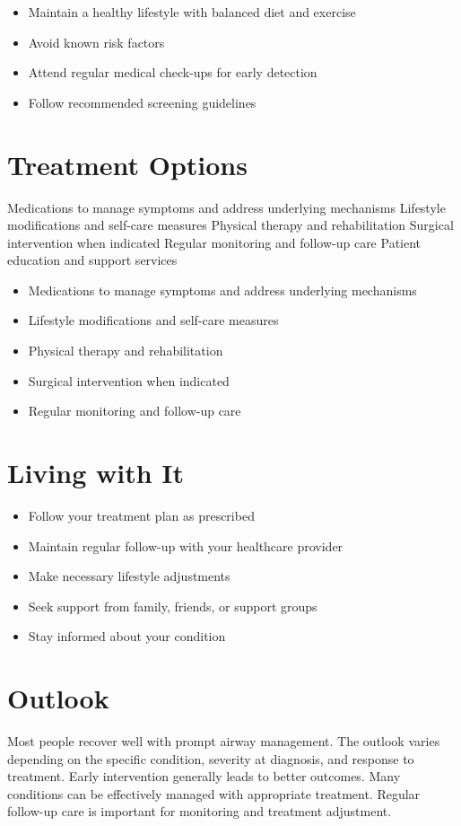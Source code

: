 \begin{itemize}[noitemsep]
  \item Maintain a healthy lifestyle with balanced diet and exercise
  \item Avoid known risk factors
  \item Attend regular medical check-ups for early detection
  \item Follow recommended screening guidelines
\end{itemize}
\section{Treatment Options}
Medications to manage symptoms and address underlying mechanisms Lifestyle modifications and self-care measures Physical therapy and rehabilitation Surgical intervention when indicated Regular monitoring and follow-up care Patient education and support services

\begin{itemize}[noitemsep]
  \item Medications to manage symptoms and address underlying mechanisms
  \item Lifestyle modifications and self-care measures
  \item Physical therapy and rehabilitation
  \item Surgical intervention when indicated
  \item Regular monitoring and follow-up care
\end{itemize}
\section{Living with It}
\begin{itemize}[noitemsep]
  \item Follow your treatment plan as prescribed
  \item Maintain regular follow-up with your healthcare provider
  \item Make necessary lifestyle adjustments
  \item Seek support from family, friends, or support groups
  \item Stay informed about your condition
\end{itemize}
\section{Outlook}
Most people recover well with prompt airway management. The outlook varies depending on the specific condition, severity at diagnosis, and response to treatment. Early intervention generally leads to better outcomes. Many conditions can be effectively managed with appropriate treatment. Regular follow-up care is important for monitoring and treatment adjustment.
